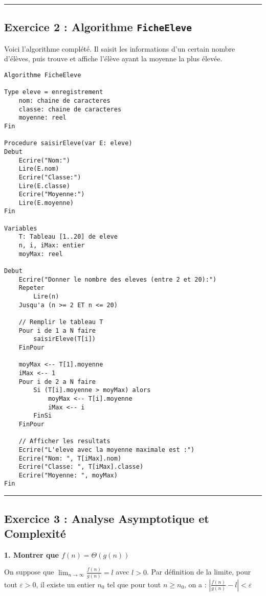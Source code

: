 \documentclass[12pt]{article}
\begin{document}
\vspace{1em}
\hrule
\vspace{1em}

\subsection*{Exercice 2 : Algorithme \texttt{FicheEleve}}
Voici l'algorithme complété. Il saisit les informations d'un certain nombre d'élèves, puis trouve et affiche l'élève ayant la moyenne la plus élevée.

\begin{verbatim}
Algorithme FicheEleve

Type eleve = enregistrement
    nom: chaine de caracteres
    classe: chaine de caracteres
    moyenne: reel
Fin

Procedure saisirEleve(var E: eleve)
Debut
    Ecrire("Nom:")
    Lire(E.nom)
    Ecrire("Classe:")
    Lire(E.classe)
    Ecrire("Moyenne:")
    Lire(E.moyenne)
Fin

Variables
    T: Tableau [1..20] de eleve
    n, i, iMax: entier
    moyMax: reel

Debut
    Ecrire("Donner le nombre des eleves (entre 2 et 20):")
    Repeter
        Lire(n)
    Jusqu'a (n >= 2 ET n <= 20)

    // Remplir le tableau T
    Pour i de 1 a N faire
        saisirEleve(T[i])
    FinPour

    moyMax <-- T[1].moyenne
    iMax <-- 1
    Pour i de 2 a N faire
        Si (T[i].moyenne > moyMax) alors
            moyMax <-- T[i].moyenne
            iMax <-- i
        FinSi
    FinPour

    // Afficher les resultats
    Ecrire("L'eleve avec la moyenne maximale est :")
    Ecrire("Nom: ", T[iMax].nom)
    Ecrire("Classe: ", T[iMax].classe)
    Ecrire("Moyenne: ", moyMax)
Fin
\end{verbatim}

\vspace{1em}
\hrule
\vspace{1em}

\subsection*{Exercice 3 : Analyse Asymptotique et Complexité}
\textbf{1. Montrer que $f(n) = \Theta(g(n))$}

On suppose que $\lim_{n \to \infty} \frac{f(n)}{g(n)} = l$ avec $l > 0$.
Par définition de la limite, pour tout $\varepsilon > 0$, il existe un entier $n_0$ tel que pour tout $n \geq n_0$, on a :
$| \frac{f(n)}{g(n)} - l | < \varepsilon$
\end{document}
